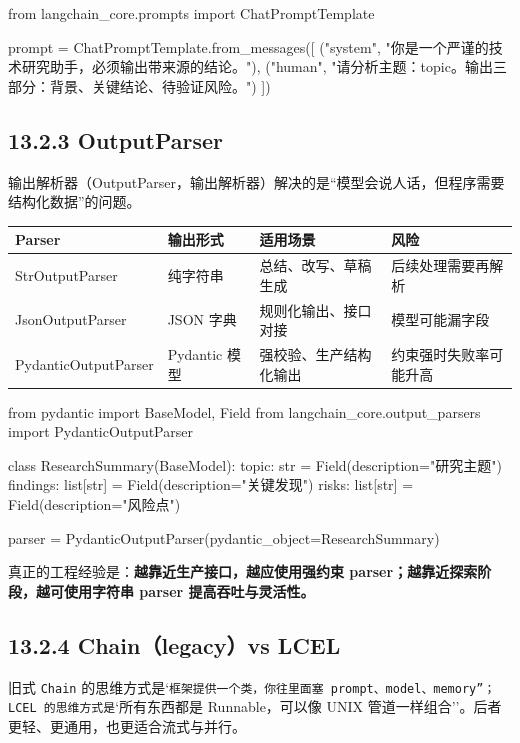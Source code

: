 \begin{codeblock}
from langchain_core.prompts import ChatPromptTemplate

prompt = ChatPromptTemplate.from_messages([
    ("system", "你是一个严谨的技术研究助手，必须输出带来源的结论。"),
    ("human", "请分析主题：{topic}。输出三部分：背景、关键结论、待验证风险。")
])
\end{codeblock}

\subsection{13.2.3 OutputParser}

输出解析器（OutputParser，输出解析器）解决的是``模型会说人话，但程序需要结构化数据''的问题。


\begingroup
\scriptsize
\setlength{\tabcolsep}{3pt}
\begin{longtable}{|p{}|p{}|p{}|p{}|}
\hline
Parser & 输出形式 & 适用场景 & 风险 \\ \hline
StrOutputParser & 纯字符串 & 总结、改写、草稿生成 & 后续处理需要再解析 \\ \hline
JsonOutputParser & JSON 字典 & 规则化输出、接口对接 & 模型可能漏字段 \\ \hline
PydanticOutputParser & Pydantic 模型 & 强校验、生产结构化输出 & 约束强时失败率可能升高 \\ \hline
\end{longtable}
\endgroup

\begin{codeblock}
from pydantic import BaseModel, Field
from langchain_core.output_parsers import PydanticOutputParser

class ResearchSummary(BaseModel):
    topic: str = Field(description="研究主题")
    findings: list[str] = Field(description="关键发现")
    risks: list[str] = Field(description="风险点")

parser = PydanticOutputParser(pydantic_object=ResearchSummary)
\end{codeblock}

真正的工程经验是：\textbf{越靠近生产接口，越应使用强约束 parser；越靠近探索阶段，越可使用字符串 parser 提高吞吐与灵活性。}


\subsection{13.2.4 Chain（legacy）vs LCEL}

旧式 \texttt{Chain} 的思维方式是`\texttt{框架提供一个类，你往里面塞 prompt、model、memory''；LCEL 的思维方式是}`所有东西都是 Runnable，可以像 UNIX 管道一样组合''。后者更轻、更通用，也更适合流式与并行。


